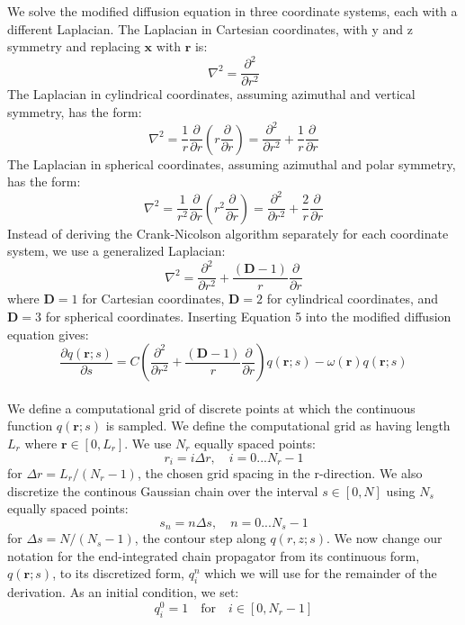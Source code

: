 \documentclass[11pt]{article} %
\begin{document}
We solve the modified diffusion equation in three coordinate systems, each with a different Laplacian. The Laplacian in Cartesian coordinates, with y and z symmetry and replacing $\textbf{x}$ with $\textbf{r}$ is:
\begin{equation}
\nabla^2 = \frac{\partial^2}{\partial r^2} 
\end{equation}
\noindent
The Laplacian in cylindrical coordinates, assuming azimuthal and vertical symmetry, has the form:
\begin{equation}
\nabla^2=\frac{1}{r} \frac{\partial}{\partial r} \left(r \frac{\partial}{\partial r} \right) =\frac{\partial^2}{\partial r^2} + \frac{1}{r} \frac{\partial}{\partial r}
\end{equation}
\noindent 
The Laplacian in spherical coordinates, assuming azimuthal and polar symmetry, has the form:
\begin{equation}
\nabla^2=\frac{1}{r^2} \frac{\partial}{\partial r} \left(r^2 \frac{\partial}{\partial r} \right) =\frac{\partial^2}{\partial r^2} + \frac{2}{r} \frac{\partial}{\partial r}
\end{equation}
\noindent
Instead of deriving the Crank-Nicolson algorithm separately for each coordinate system, we use a generalized Laplacian:
\begin{equation}
\nabla^2=\frac{\partial^2}{\partial r^2} + \frac{\left(\textbf{D}-1\right)}{r}\frac{\partial}{\partial r}
\end{equation}
\noindent
where $\textbf{D}=1$ for Cartesian coordinates, $\textbf{D}=2$ for cylindrical coordinates, and $\textbf{D}=3$ for spherical coordinates. Inserting Equation 5 into the modified diffusion equation gives:
\begin{equation}
\frac{\partial q(\textbf{r}; s)}{\partial s} = C \left(\frac{\partial^2}{\partial r^2} + \frac{(\textbf{D}-1)}{r} \frac{\partial}{\partial r}    \right) q(\textbf{r}; s) - \omega (\textbf{r}) q(\textbf{r}; s)
\end{equation}\\[12pt]


We define a computational grid of discrete points at which the continuous function $q(\textbf{r};s)$ is sampled. We define the computational grid as having length $L_r$ where $\textbf{r} \in [0,L_r]$. We use $N_r$ equally spaced points:
\begin{equation}
r_i = i \Delta r, \quad i = 0 ... N_r - 1
\end{equation}
\noindent
for $\Delta r = L_r/(N_r-1)$, the chosen grid spacing in the r-direction. We also discretize the continous Gaussian chain over the interval $s \in [0,N]$ using $N_s$ equally spaced points:
\begin{equation}
s_n = n \Delta s, \quad n = 0 ... N_s -1
\end{equation}
\noindent
for $\Delta s = N/(N_s-1)$, the contour step along $q(r,z;s)$. We now change our notation for the end-integrated chain propagator from its continuous form, $q(\textbf{r};s)$, to its discretized form, $q_{i}^n$ which we will use for the remainder of the derivation. As an initial condition, we set:
\begin{equation}
q_{i}^0 = 1 \quad \text{for} \quad i \in [0,N_r-1]
\end{equation}
\end{document}
